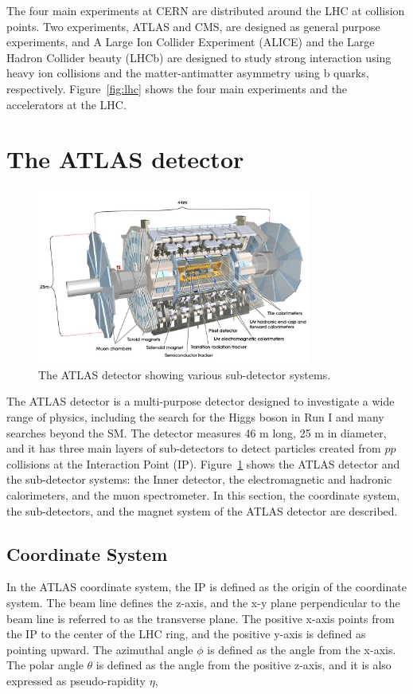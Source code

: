 The four main experiments at CERN are distributed around the LHC at collision points. Two experiments, ATLAS and CMS, are designed as general purpose experiments, and A Large Ion Collider Experiment (ALICE) and the Large Hadron Collider beauty (LHCb) are designed to study strong interaction using heavy ion collisions and the matter-antimatter asymmetry using b quarks, respectively. Figure~\ref{fig:lhc} shows the four main experiments and the accelerators at the LHC.


\section{The ATLAS detector}
\label{sec:atlas:detector}

\begin{figure}[!htb]
    \includegraphics[width=0.8\textwidth]{figures/atlas.png}
    \centering
    \caption{The ATLAS detector showing various sub-detector systems.}
    \label{fig:atlas}
\end{figure}

The ATLAS detector is a multi-purpose detector designed to investigate a wide range of physics, including the search for the Higgs boson in Run I and many searches beyond the SM. The detector measures 46 m long, 25 m in diameter, and it has three main layers of sub-detectors to detect particles created from $pp$ collisions at the Interaction Point (IP). Figure~\ref{fig:atlas} shows the ATLAS detector and the sub-detector systems: the Inner detector, the electromagnetic and hadronic calorimeters, and the muon spectrometer. In this section, the coordinate system, the sub-detectors, and the magnet system of the ATLAS detector are described.

\subsection{Coordinate System}
\label{sec:atlas:coordinate}
In the ATLAS coordinate system, the IP is defined as the origin of the coordinate system. The beam line defines the z-axis, and the x-y plane perpendicular to the beam line is referred to as the transverse plane. The positive x-axis points from the IP to the center of the LHC ring, and the positive y-axis is defined as pointing upward. The azimuthal angle $\phi$ is defined as the angle from the x-axis. The polar angle $\theta$ is defined as the angle from the positive z-axis, and it is also expressed as pseudo-rapidity $\eta$,


